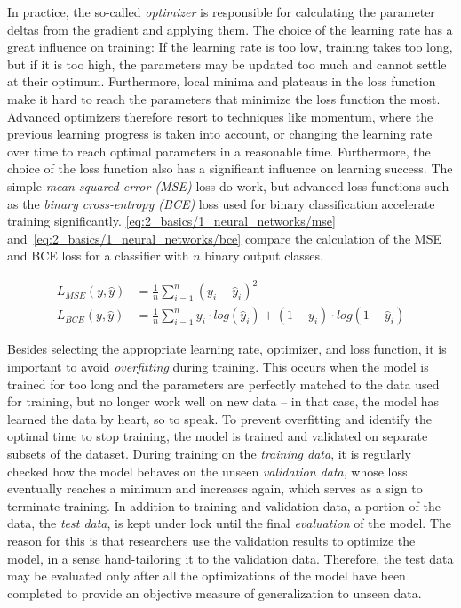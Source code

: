 In practice, the so-called \emph{optimizer} is responsible for calculating the parameter deltas from the gradient and applying them. The choice of the learning rate has a great influence on training: If the learning rate is too low, training takes too long, but if it is too high, the parameters may be updated too much and cannot settle at their optimum. Furthermore, local minima and plateaus in the loss function make it hard to reach the parameters that minimize the loss function the most. Advanced optimizers therefore resort to techniques like momentum, where the previous learning progress is taken into account, or changing the learning rate over time to reach optimal parameters in a reasonable time. Furthermore, the choice of the loss function also has a significant influence on learning success. The simple \emph{mean squared error (MSE)} loss do work, but advanced loss functions such as the \emph{binary cross-entropy (BCE)} loss used for binary classification accelerate training significantly. \autoref{eq:2_basics/1_neural_networks/mse} and~\ref{eq:2_basics/1_neural_networks/bce} compare the calculation of the MSE and BCE loss for a classifier with $n$ binary output classes.

\begin{align}
    L_{MSE}(y, \hat{y}) &= \frac{1}{n} \sum_{i=1}^n (y_i - \hat{y}_i)^2
    \label{eq:2_basics/1_neural_networks/mse} \\
    L_{BCE}(y, \hat{y}) &= \frac{1}{n} \sum_{i=1}^n y_i \cdot log( \hat{y}_i) + (1-y_i) \cdot log(1 - \hat{y}_i)
    \label{eq:2_basics/1_neural_networks/bce}
\end{align}

Besides selecting the appropriate learning rate, optimizer, and loss function, it is important to avoid \emph{overfitting} during training. This occurs when the model is trained for too long and the parameters are perfectly matched to the data used for training, but no longer work well on new data -- in that case, the model has learned the data by heart, so to speak. To prevent overfitting and identify the optimal time to stop training, the model is trained and validated on separate subsets of the dataset. During training on the \emph{training data}, it is regularly checked how the model behaves on the unseen \emph{validation data}, whose loss eventually reaches a minimum and increases again, which serves as a sign to terminate training. In addition to training and validation data, a portion of the data, the \emph{test data}, is kept under lock until the final \emph{evaluation} of the model. The reason for this is that researchers use the validation results to optimize the model, in a sense hand-tailoring it to the validation data. Therefore, the test data may be evaluated only after all the optimizations of the model have been completed to provide an objective measure of generalization to unseen data.

